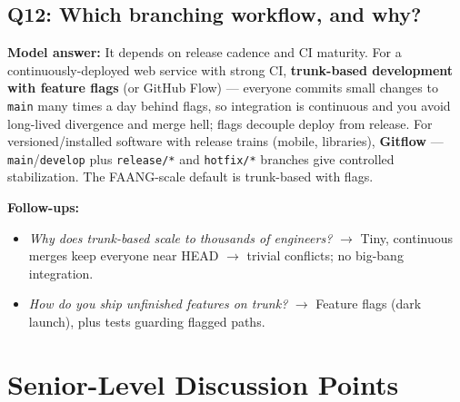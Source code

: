\documentclass[11pt]{article}
\providecommand{\tightlist}{\setlength{\itemsep}{1pt}\setlength{\parskip}{0pt}}
\begin{document}
\subsection{Q12: Which branching workflow, and why?}\label{q12-which-branching-workflow-and-why}

\textbf{Model answer:} It depends on release cadence and CI maturity. For a continuously-deployed web service with strong CI, \textbf{trunk-based development with feature flags} (or GitHub Flow) --- everyone commits small changes to \texttt{main} many times a day behind flags, so integration is continuous and you avoid long-lived divergence and merge hell; flags decouple deploy from release. For versioned/installed software with release trains (mobile, libraries), \textbf{Gitflow} --- \texttt{main}/\texttt{develop} plus \texttt{release/*} and \texttt{hotfix/*} branches give controlled stabilization. The FAANG-scale default is trunk-based with flags.

\textbf{Follow-ups:}

\begin{itemize}
\tightlist
\item
  \emph{Why does trunk-based scale to thousands of engineers?} \(\rightarrow\) Tiny, continuous merges keep everyone near HEAD \(\rightarrow\) trivial conflicts; no big-bang integration.
\item
  \emph{How do you ship unfinished features on trunk?} \(\rightarrow\) Feature flags (dark launch), plus tests guarding flagged paths.
\end{itemize}

\section{Senior-Level Discussion Points}\label{senior-level-discussion-points}
\end{document}
